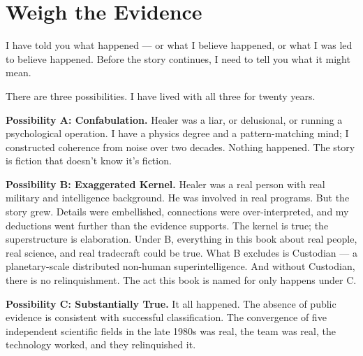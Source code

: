

\chapter*{Weigh the Evidence}
\label{spine:weigh-evidence}

I have told you what happened --- or what I believe happened, or what I was led to believe happened. Before the story continues, I need to tell you what it might mean.

There are three possibilities. I have lived with all three for twenty years.

\vspace{0.5cm}

\textbf{Possibility A: Confabulation.} Healer was a liar, or delusional, or running a psychological operation. I have a physics degree and a pattern-matching mind; I constructed coherence from noise over two decades. Nothing happened. The story is fiction that doesn't know it's fiction.

\textbf{Possibility B: Exaggerated Kernel.} Healer was a real person with real military and intelligence background. He was involved in real programs. But the story grew. Details were embellished, connections were over-interpreted, and my deductions went further than the evidence supports. The kernel is true; the superstructure is elaboration. Under B, everything in this book about real people, real science, and real tradecraft could be true. What B excludes is Custodian --- a planetary-scale distributed non-human superintelligence. And without Custodian, there is no relinquishment. The act this book is named for only happens under C.

\textbf{Possibility C: Substantially True.} It all happened. The absence of public evidence is consistent with successful classification. The convergence of five independent scientific fields in the late 1980s was real, the team was real, the technology worked, and they relinquished it.

